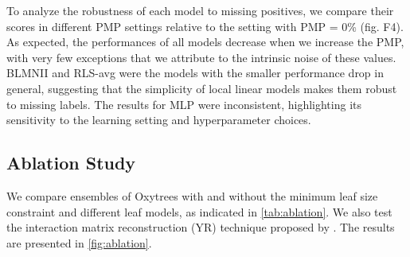 \documentclass[letterpaper]{article}
\begin{document}
To analyze the robustness of each model to missing positives, we compare their scores in different PMP settings relative to the setting with PMP = 0\%
(fig. F4).
As expected, the performances of all models decrease when we increase the PMP, with very few exceptions that we attribute to the intrinsic noise of these values.
BLMNII and RLS-avg were the models with the smaller performance drop in general, suggesting that the simplicity of local linear models makes them robust to missing labels.
The results for MLP were inconsistent, highlighting its sensitivity to the learning setting and hyperparameter choices.



\subsection{Ablation Study}
\label{sec:ablation}

We compare ensembles of Oxytrees with and without the minimum leaf size constraint and different leaf models, as indicated in \cref{tab:ablation}. We also test the interaction matrix reconstruction (YR) technique proposed by \citet{pliakos_drug-target_2020}.
The results are presented in \cref{fig:ablation}.
\end{document}
